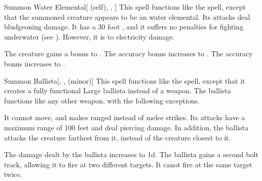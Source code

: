 \lowercase{\hypertarget{spell:Summon Water Elemental}{}}\label{spell:Summon Water Elemental}
\begin{attuneability}[Rank 2]{\hypertarget{spell:Summon Water Elemental}{Summon Water Elemental}}[ (self), , ]
This spell functions like the  spell, except that the summoned creature appears to be an water elemental.
Its attacks deal bludgeoning damage.
It has a 30 foot , and it suffers no penalties for fighting underwater (see ).
However, it is  to electricity damage.

\rankline
{} The creature gains a  bonus to .
 The accuracy bonus increases to .
 The accuracy bonus increases to .

\end{attuneability}
\vspace{0.25em}



\lowercase{\hypertarget{spell:Summon Ballista}{}}\label{spell:Summon Ballista}
\begin{freeability}[Rank 3]{\hypertarget{spell:Summon Ballista}{Summon Ballista}}[, ,  (minor)]
This spell functions like the  spell, except that it creates a fully functional Large ballista instead of a weapon.
The ballista functions like any other weapon, with the following exceptions.

It cannot move, and makes ranged  instead of melee strikes.
Its attacks have a maximum range of 100 feet and deal piercing damage.
In addition, the ballista attacks the creature farthest from it, instead of the creature closest to it.

\rankline
{} The damage dealt by the ballista increases to  \minus1d.
 The ballista gains a second bolt track, allowing it to fire at two different targets.
It canot fire at the same target twice.

\end{freeability}
\vspace{0.25em}



